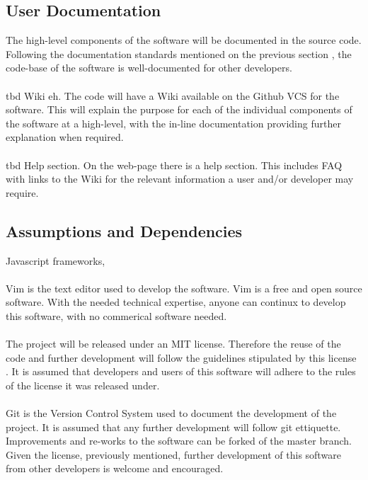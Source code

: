 \documentclass{article}
\newcommand{\comment}[1]{}
\begin{document}
\subsection{User Documentation}\label{userDocumentation}
\comment{
List the user documentation components (such as user manuals, on-line help, and tutorials) that will be delivered along with the software. Identify any known user documentation delivery formats or standards.
	}
The high-level components of the software will be documented in the source code. Following the documentation standards mentioned on the previous section , the code-base of the software is well-documented for other developers.
\\ \\
\acrshort{tbd} Wiki eh. The code will have a Wiki available on the Github VCS for the software. This will explain the purpose for each of the individual components of the software at a high-level, with the in-line documentation providing further explanation when required.
\\ \\
\acrshort{tbd} Help section. On the web-page there is a help section. This includes FAQ with links to the Wiki for the relevant information a user and/or developer may require.
\subsection{Assumptions and Dependencies}
\comment{
List any assumed factors (as opposed to known facts) that could affect the requirements stated in the SRS. These could include third-party or commercial components that you plan to use, issues around the development environment, or constraints. The project could be affected if these assumptions are incorrect, are not shared, or change. Also identify any dependencies the project has on external factors, such as software components that you intent to reuse from another project, unless they are already documented elsewhere (for example, in the vision and scope document or the project plan)
	}
Javascript frameworks,
\\ \\
Vim is the text editor used to develop the software. Vim is a free and open source software. With the needed technical expertise, anyone can continux to develop this software, with no commerical software needed.
\\ \\
The project will be released under an MIT license. Therefore the reuse of the code and further development will follow the guidelines stipulated by this license \parencite{mit20}. It is assumed that developers and users of this software will adhere to the rules of the license it was released under.
\\ \\
Git is the Version Control System used to document the development of the project. It is assumed that any further development will follow git ettiquette. Improvements and re-works to the software can be forked of the master branch. Given the license, previously mentioned, further development of this software from other developers is welcome and encouraged.
\newpage
\end{document}
